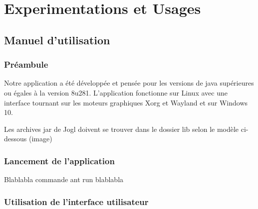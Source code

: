 \chapter{Experimentations et Usages}

\section{Manuel d'utilisation}

\subsection{Préambule}
Notre application a été développée et pensée pour les versions de java supérieures ou égales à la version 8u281.
L'application fonctionne sur Linux avec une interface tournant sur les moteurs graphiques Xorg et Wayland et sur Windows 10.

Les archives jar de Jogl doivent se trouver dans le dossier lib selon le modèle ci-dessous (image)


\subsection{Lancement de l'application}

Blablabla commande ant run blablabla

\subsection{Utilisation de l'interface utilisateur}

